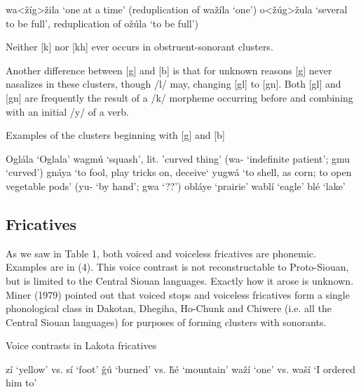 \documentclass[output=paper]{LSP/langsci}
\begin{document}
\begin{exe}
\ex \begin{xlist}
\ex wa<\v{z}\'ig>\v{z}ila `one at a time' (reduplication of wa\v{z}\'ila `one')
\ex o<\v{z}\'ug>\v{z}ula `several to be full', reduplication of o\v{z}\'ula `to be full')
\end{xlist}
\end{exe}

Neither [k] nor [kh] ever occurs in obstruent-sonorant clusters. 

Another difference between [g] and [b] is that for unknown reasons [g] never nasalizes in these clusters, though /l/ may, changing [gl] to [gn]. Both [gl] and [gn] are frequently the result of a /k/ morpheme occurring before and combining with an initial /y/ of a verb.

\begin{exe}
\ex Examples of the clusters beginning with [g] and [b]
\begin{xlist}
\ex Ogl\'ala `Oglala'
\ex wagm\'u `squash', lit. 'curved thing' (wa- `indefinite patient'; gmu `curved')
\ex gn\'aya `to fool, play tricks on, deceive`
\ex yugw\'a `to shell, as corn; to open vegetable pods' (yu- `by hand'; gwa `??')
\ex obl\'aye `prairie'
\ex wabl\'i `eagle'
\ex bl\'e `lake'
\end{xlist}
\end{exe}

\subsection{Fricatives}

As we saw in Table 1, both voiced and voiceless fricatives are phonemic. Examples are in (4). This voice contrast is not reconstructable to Proto-Siouan, but is limited to the Central Siouan languages. Exactly how it arose is unknown. Miner (1979) pointed out that voiced stops and voiceless fricatives form a single phonological class in Dakotan, Dhegiha, Ho-Chunk and Chiwere (i.e. all the Central Siouan languages) for purposes of forming clusters with sonorants.

\begin{exe}
\ex Voice contrasts in Lakota fricatives
\begin{xlist}
\ex z\'i `yellow' vs. s\'i `foot'
\ex \v{g}\'u `burned' vs. \v{h}\'e `mountain'
\ex wa\v{z}\'i `one' vs. wa\v{s}\'i `I ordered him to'
\end{xlist}
\end{exe}
\end{document}
